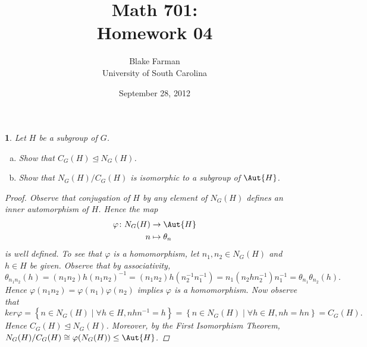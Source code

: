 \documentclass[10pt]{amsart}
\author{Blake Farman\\University of South Carolina}
\title{Math 701:\\Homework 04}
\date{September 28, 2012}
\begin{document}
\maketitle

\newtheorem{thm}{}
\newtheorem{lem}{Lemma}

\begin{thm}
  Let $H$ be a subgroup of $G$.
  \begin{enumerate}[(a)]
  \item
    Show that $C_G(H) \unlhd N_G(H)$.
  \item
    Show that $N_G(H)/C_G(H)$ is isomorphic to a subgroup of $\Aut{H}$.
  \end{enumerate}
  \begin{proof}
    Observe that conjugation of $H$ by any element of $N_G(H)$ defines an inner automorphism of $H$.
    Hence the map
    \begin{align*}
      \varphi \colon N_G(H) &\rightarrow \Aut{H}\\
      n &\mapsto \theta_n
    \end{align*}
    is well defined.
    To see that $\varphi$ is a homomorphism, let $n_1,n_2 \in N_G(H)$ and $h \in H$ be given.
    Observe that by associativity, $$\theta_{n_1n_2}(h) = (n_1n_2)h(n_1n_2)^{-1} = (n_1n_2) h (n_2^{-1}n_1^{-1}) = n_1(n_2 h n_2^{-1})n_1^{-1} = \theta_{n_1}\theta_{n_2}(h).$$
    Hence $\varphi(n_1n_2) = \varphi(n_1)\varphi(n_2)$ implies $\varphi$ is a homomorphism.
    Now observe that $$ker\varphi = \left\{n \in N_G(H) \mid \forall h \in H, nhn^{-1} = h\right\} = \left\{n \in N_G(H) \mid \forall h \in H, nh = hn\right\} = C_G(H).$$
    Hence $C_G(H) \unlhd N_G(H)$.  
    Moreover, by the First Isomorphism Theorem, $N_G(H)/C_G(H) \cong \varphi(N_G(H)) \leq \Aut{H}$.

\end{proof}
\end{thm}
\end{document}
